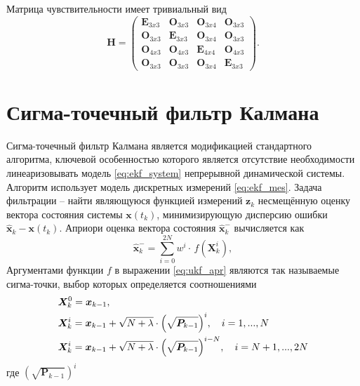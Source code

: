 Матрица чувствительности имеет тривиальный вид
\begin{equation}
{\bm{H}} =
\left( {\begin{array}{*{20}{c}}
	{{{\bm{E}}_{3x3}}}&{{{\bm{O}}_{3x3}}}&{{{\bm{O}}_{3x4}}}&{{{\bm{O}}_{3x3}}}\\
	{{{\bm{O}}_{3x3}}}&{{{\bm{E}}_{3x3}}}&{{\bm{O}}_{3x4}}&{{{\bm{O}}_{3x3}}}\\
	{{{\bm{O}}_{4x3}}}&{{{\bm{O}}_{4x3}}}&{{{\bm{E}}_{4x4}}}&{{{\bm{O}}_{4x3}}}\\
	{{{\bm{O}}_{3x3}}}&{{{\bm{O}}_{3x3}}}&{{{\bm{O}}_{3x4}}}&{{{\bm{E}}_{3x3}}}
	\end{array}} \right).
\end{equation}

\section{Сигма-точечный фильтр Калмана}
Сигма-точечный фильтр Калмана является модификацией стандартного алгоритма, ключевой особенностью которого является отсутствие необходимости линеаризовывать модель \eqref{eq:ekf_system} непрерывной динамической системы. Алгоритм использует модель дискретных измерений \eqref{eq:ekf_mes}.
Задача фильтрации -- найти являющуюся функцией измерений $\bm z_k$ несмещённую оценку вектора состояния системы  $\bm x(t_k)$, минимизирующую дисперсию ошибки  ${\hat{\bm{x}}_k} - \bm x({t_k})$.
Априори оценка вектора состояния $\bm{\hat x}_k^-$ вычисляется как
\begin{equation} \label{eq:ukf_apr}
{\bm{\hat x}}_k^-  = \sum\limits_{i = 0}^{2N} {{w^i} \cdot } \,f\left( {{\bm{X}}_k^i} \right),
\end{equation}
Аргументами функции $f$ в выражении \eqref{eq:ukf_apr} являются так называемые сигма-точки, выбор которых определяется соотношениями
\begin{equation} \label{eq:ukf_points}
\begin{aligned}
&{{\bm{X}}_k^0 = {{\bm{x}}_{k - 1}}},
\\
&{{\bm{X}}_k^i = {{\bm{x}}_{k - 1}} + \sqrt {N + {\rm{\lambda }}}  \cdot {{\left( {\sqrt {{{\bm{P}}_{k - 1}}} } \right)}^i}}, \quad {i = 1,...,N}
\\
&{{\bm{X}}_k^i = {{\bm{x}}_{k - 1}} + \sqrt {N + {\rm{\lambda }}}  \cdot {{\left( {\sqrt {{{\bm{P}}_{k - 1}}} } \right)}^{i - N}}}, \quad {i = N + 1,...,2N}
\end{aligned}
\end{equation}
где
${{{\left( {\sqrt {{{\bm{P}}_{k - 1}}} } \right)}^i}}$
